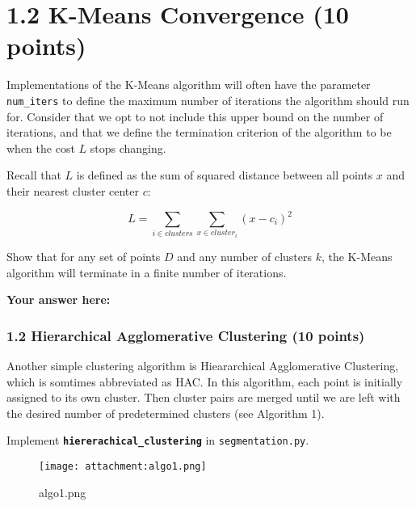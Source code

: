 \documentclass[11pt]{article}
\begin{document}
    \hypertarget{k-means-convergence-10-points}{%
\section{1.2 K-Means Convergence (10
points)}\label{k-means-convergence-10-points}}

Implementations of the K-Means algorithm will often have the parameter
\texttt{num\_iters} to define the maximum number of iterations the
algorithm should run for. Consider that we opt to not include this upper
bound on the number of iterations, and that we define the termination
criterion of the algorithm to be when the cost \(L\) stops changing.

Recall that \(L\) is defined as the sum of squared distance between all
points \(x\) and their nearest cluster center \(c\):

\[L = \sum_{i \in clusters}\sum_{x \in cluster_i} (x - c_i)^2\]

Show that for any set of points \textbf{\(D\)} and any number of
clusters \(k\), the K-Means algorithm will terminate in a finite number
of iterations.

    \textbf{Your answer here:}

    \hypertarget{hierarchical-agglomerative-clustering-10-points}{%
\subsubsection{1.2 Hierarchical Agglomerative Clustering (10
points)}\label{hierarchical-agglomerative-clustering-10-points}}

Another simple clustering algorithm is Hieararchical Agglomerative
Clustering, which is somtimes abbreviated as HAC. In this algorithm,
each point is initially assigned to its own cluster. Then cluster pairs
are merged until we are left with the desired number of predetermined
clusters (see Algorithm 1).

Implement \textbf{\texttt{hiererachical\_clustering}} in
\texttt{segmentation.py}.

\begin{figure}
\centering
\texttt{[image: attachment:algo1.png]}
\caption{algo1.png}
\end{figure}
\end{document}
